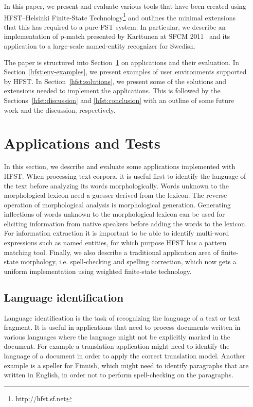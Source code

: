 \documentclass{llncs}
\begin{document}
In this paper, we present and evaluate various tools that have been created using HFST--Helsinki Finite-State Technology\footnote{http://hfst.sf.net} and outlines the minimal extensions that this has required to a pure FST system. In particular, we describe an implementation of p-match presented by Karttunen at SFCM 2011~\cite{karttunen/2011} and its application to a large-scale named-entity recognizer for Swedish.

The paper is structured into Section~\ref{hfst:structural-layout} on applications and their evaluation. In Section~\ref{hfst:env-examples}, we present examples of user environments supported by HFST. In Section~\ref{hfst:solutions}, we present some of the solutions and extensions needed to implement the applications. This is followed by the Sections~\ref{hfst:discussion} and \ref{hfst:conclusion} with an outline of some future work and the discussion, respectively.

\section{Applications and Tests}\label{hfst:structural-layout}
In this section, we describe and evaluate some applications implemented with HFST. When processing text corpora, it is useful first to identify the language of the text before analyzing its words morphologically. Words unknown to the morphological lexicon need a guesser derived from the lexicon. The reverse operation of morphological analysis is morphological generation. Generating inflections of words unknown to the morphological lexicon can be used for eliciting information from native speakers before adding the words to the lexicon. For information extraction it is important to be able to identify multi-word expressions such as named entities, for which purpose HFST has a pattern matching tool. Finally, we also describe a traditional application area of finite-state morphology, i.e. spell-checking and spelling correction, which now gets a uniform implementation using weighted finite-state technology. 

\subsection{Language identification}
Language identification is the task of recognizing the language of a
text or text fragment. It is useful in applications that need to
process documents written in various languages where the language
might not be explicitly marked in the document. For example a translation
application might need to identify the language of a document in order
to apply the correct translation model. Another example is a speller
for Finnish, which might need to identify paragraphs that are written in
English, in order not to perform spell-checking on the paragraphs.
\end{document}
